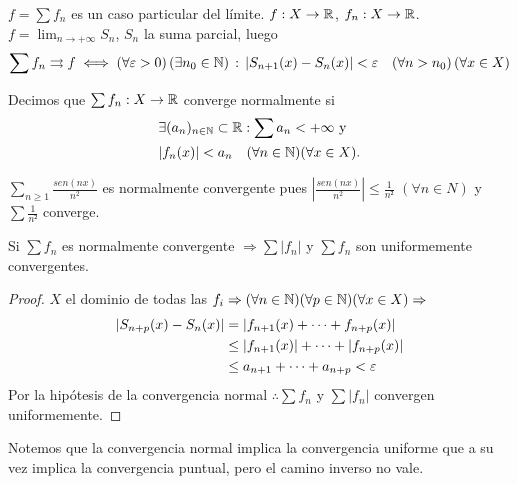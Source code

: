 \(f = \sum f_n\) es un caso particular del límite.
\(f : X \to \mathbb{R} \), \(f_n: X \to \mathbb{R} \). \(f = \lim_{n \to +\infty} S_n\), \(S_n\) la suma parcial, luego
\begin{align*}
  \sum f_n \rightrightarrows f \iff (\forall \varepsilon > 0) \, (\exists n_0 \in \mathbb{N}) \, : \, |S_{n+1}(x) - S_n(x)| < \varepsilon \quad (\forall n > n_0) \, (\forall x \in X)
\end{align*}

\begin{definition}
  Decimos que \(\sum f_n: X \to \mathbb{R} \) converge normalmente si
  \begin{align*}
     & \exists (a_n)_{n \in \mathbb{N}} \subset \mathbb{R} : \sum a_n < +\infty \text{ y } \\
     & |f_n(x)| < a_n \quad (\forall n \in \mathbb{N})(\forall x \in X).
  \end{align*}
\end{definition}

\begin{eg}
  \(\sum_{n \geq 1} \frac{sen(nx)}{n^2} \) es normalmente convergente pues \(|\frac{sen(nx)}{n^2}| \leq \frac{1}{n²} \) \((\forall n \in N)\) y \(\sum \frac{1}{n²} \) converge.
\end{eg}

\begin{theorem}
  Si \(\sum f_n\) es normalmente convergente \(\Rightarrow \sum |f_n|\) y \(\sum f_n\) son uniformemente convergentes.
  \begin{proof}
    \(X\) el dominio de todas las \(f_i \Rightarrow (\forall n \in \mathbb{N})(\forall p \in \mathbb{N})(\forall x \in X) \Rightarrow \) \begin{align*}
      |S_{n + p}(x) - S_n(x)| & = |f_{n+1}(x) + \cdots + f_{n + p}(x)| \\
      & \leq |f_{n+1}(x)| + \cdots + |f_{n+p}(x)| \\
      & \leq a_{n+1} + \cdots + a_{n+p} < \varepsilon
    \end{align*}
    Por la hipótesis de la convergencia normal \(\therefore \sum f_n\) y \(\sum |f_n|\) convergen uniformemente.
  \end{proof}
\end{theorem}

Notemos que la convergencia normal implica la convergencia uniforme que a su vez implica la convergencia puntual, pero el camino inverso no vale.

